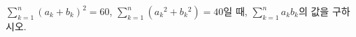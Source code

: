 $\displaystyle\sum_{k=1}^{n}(a_k+b_k)^2=60$, $\displaystyle\sum_{k=1}^{n}(a_k{}^2+b_k{}^2)=40$일 때, $\displaystyle\sum_{k=1}^{n}a_kb_k$의 값을 구하시오.
